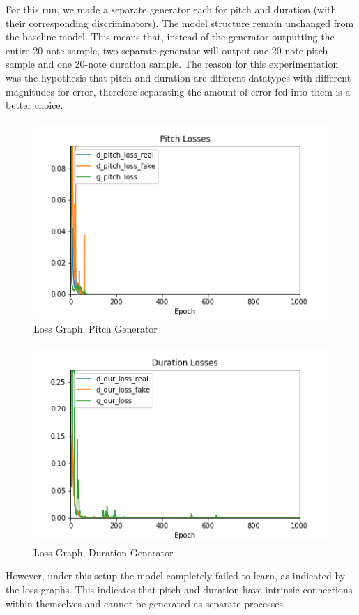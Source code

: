 \documentclass[12pt,oneside]{chicagocapstone}
\begin{document}
For this run, we made a separate generator each for pitch and duration (with their corresponding discriminators). The model structure remain unchanged from the baseline model. This means that, instead of the generator outputting the entire 20-note sample, two separate generator will output one 20-note pitch sample and one 20-note duration sample. The reason for this experimentation was the hypothesis that pitch and duration are different datatypes with different magnitudes for error, therefore separating the amount of error fed into them is a better choice.
\begin{figure}

{\centering \includegraphics[width=0.8\linewidth]{figure/ap_newmod_pitch} 

}

\caption{Loss Graph, Pitch Generator}\label{fig:unnamed-chunk-12}
\end{figure}
\begin{figure}

{\centering \includegraphics[width=0.8\linewidth]{figure/ap_newmod_dur} 

}

\caption{Loss Graph, Duration Generator}\label{fig:unnamed-chunk-13}
\end{figure}
However, under this setup the model completely failed to learn, as indicated by the loss graphs. This indicates that pitch and duration have intrinsic connections within themselves and cannot be generated as separate processes.
\end{document}
